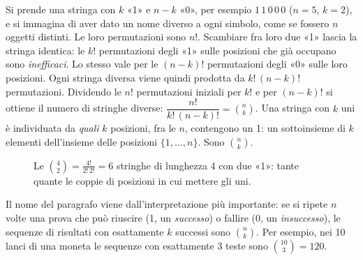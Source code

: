 \begin{dimostrazione}
 Si prende una stringa con $k$ «1» e $n - k$ «0», per esempio
$1\,1\,0\,0\,0$ ($n = 5$, $k = 2$), e si immagina di aver dato un nome diverso a ogni simbolo, come se fossero $n$
oggetti distinti. Le loro permutazioni sono $n!$.
 Scambiare fra loro due «1» lascia la stringa identica: le $k!$
permutazioni degli «1» sulle posizioni che già occupano sono \emph{inefficaci}. Lo stesso vale per le $(n-k)!$
permutazioni degli «0» sulle loro posizioni.
 Ogni stringa diversa viene quindi prodotta da $k!\,(n-k)!$ permutazioni. Dividendo le $n!$
permutazioni iniziali per $k!$ e per $(n-k)!$ si ottiene il numero di stringhe diverse: $\dfrac{n!}{k!\,(n-k)!} =
\binom{n}{k}$.
 Una stringa con $k$ uni è individuata da \emph{quali} $k$ posizioni, fra le $n$, contengono
un 1: un sottoinsieme di $k$ elementi dell'insieme delle posizioni $\{1, \ldots, n\}$. Sono $\binom{n}{k}$.
\end{dimostrazione}

\begin{figure}[H]
\centering
{}
\caption{Le $\binom{4}{2} = \frac{4!}{2!\,2!} = 6$ stringhe di lunghezza 4 con due «1»: tante quante le coppie di
posizioni in cui mettere gli uni.}
\end{figure}

Il nome del paragrafo viene dall'interpretazione più importante: se si ripete $n$ volte una prova che può riuscire
(1, un \emph{successo}) o fallire (0, un \emph{insuccesso}), le sequenze di risultati con esattamente $k$ successi sono
$\binom{n}{k}$. Per esempio, nei 10 lanci di una moneta le sequenze con esattamente 3 teste sono $\binom{10}{3} = 120$.

